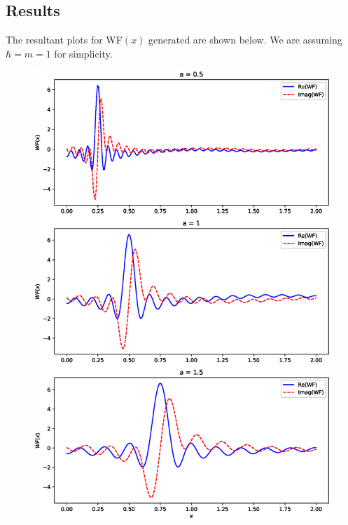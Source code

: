 \documentclass[12pt,a4paper]{article}
\begin{document}
\subsection{Results}

The resultant plots for WF$(x)$ generated are shown below. We are assuming $\hbar = m = 1$ for simplicity.

\begin{figure}[H]
    \centering
    \includegraphics[width=0.9\linewidth]{images/wannier.eps}
\end{figure}
\end{document}
